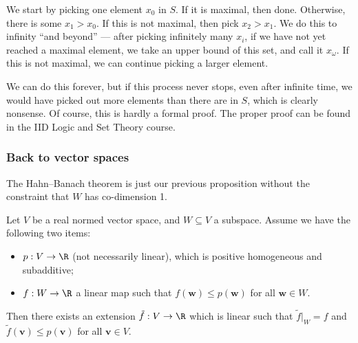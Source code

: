 \documentclass[a4paper]{article}
\begin{document}
We start by picking one element $x_0$ in $S$. If it is maximal, then done. Otherwise, there is some $x_1 > x_0$. If this is not maximal, then pick $x_2 > x_1$. We do this to infinity ``and beyond'' --- after picking infinitely many $x_i$, if we have not yet reached a maximal element, we take an upper bound of this set, and call it $x_\omega$. If this is not maximal, we can continue picking a larger element.

We can do this forever, but if this process never stops, even after infinite time, we would have picked out more elements than there are in $S$, which is clearly nonsense. Of course, this is hardly a formal proof. The proper proof can be found in the IID Logic and Set Theory course.

\subsubsection*{Back to vector spaces}
The Hahn--Banach theorem is just our previous proposition without the constraint that $W$ has co-dimension 1.
\begin{thm}
  Let $V$ be a real normed vector space, and $W\subseteq V$ a subspace. Assume we have the following two items:
  \begin{itemize}
    \item $p: V \to \R$ (not necessarily linear), which is positive homogeneous and subadditive;
    \item $f: W \to \R$ a linear map such that $f(\mathbf{w}) \leq p (\mathbf{w})$ for all $\mathbf{w}\in W$.
  \end{itemize}
  Then there exists an extension $\tilde{f}: V\to \R$ which is linear such that $\tilde{f}|_{W} = f$ and $\tilde{f}(\mathbf{v}) \leq p(\mathbf{v})$ for all $\mathbf{v}\in V$.
\end{thm}
\end{document}
